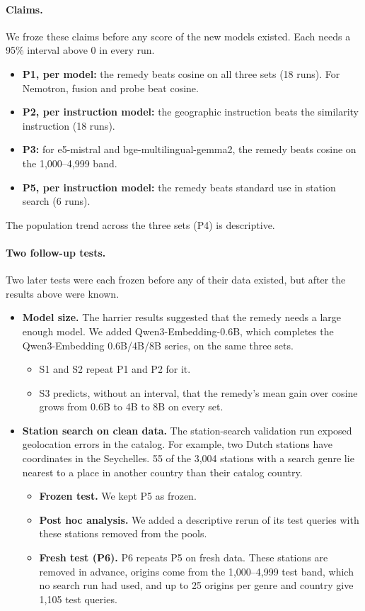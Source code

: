\paragraph{Claims.} We froze these claims before any score of the new models existed. Each needs a 95\% interval above 0 in every run.
\begin{itemize}
\item \textbf{P1, per model:} the remedy beats cosine on all three sets (18 runs). For Nemotron, fusion and probe beat cosine.
\item \textbf{P2, per instruction model:} the geographic instruction beats the similarity instruction (18 runs).
\item \textbf{P3:} for e5-mistral and bge-multilingual-gemma2, the remedy beats cosine on the 1,000--4,999 band.
\item \textbf{P5, per instruction model:} the remedy beats standard use in station search (6 runs).
\end{itemize}
The population trend across the three sets (P4) is descriptive.

\paragraph{Two follow-up tests.} Two later tests were each frozen before any of their data existed, but after the results above were known.
\begin{itemize}
\item \textbf{Model size.} The harrier results suggested that the remedy needs a large enough model. We added Qwen3-Embedding-0.6B, which completes the Qwen3-Embedding 0.6B/4B/8B series, on the same three sets.
  \begin{itemize}
  \item S1 and S2 repeat P1 and P2 for it.
  \item S3 predicts, without an interval, that the remedy's mean gain over cosine grows from 0.6B to 4B to 8B on every set.
  \end{itemize}
\item \textbf{Station search on clean data.} The station-search validation run exposed geolocation errors in the catalog. For example, two Dutch stations have coordinates in the Seychelles. 55 of the 3,004 stations with a search genre lie nearest to a place in another country than their catalog country.
  \begin{itemize}
  \item \textbf{Frozen test.} We kept P5 as frozen.
  \item \textbf{Post hoc analysis.} We added a descriptive rerun of its test queries with these stations removed from the pools.
  \item \textbf{Fresh test (P6).} P6 repeats P5 on fresh data. These stations are removed in advance, origins come from the 1,000--4,999 test band, which no search run had used, and up to 25 origins per genre and country give 1,105 test queries.
  \end{itemize}
\end{itemize}
